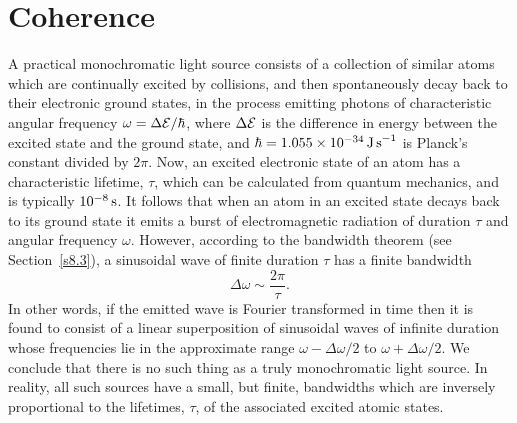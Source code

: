 \section{Coherence}
A practical monochromatic light source consists of a collection of similar atoms which are continually excited by collisions, and
then spontaneously decay back to their electronic ground states, in the process emitting  photons of characteristic angular
frequency $\omega=\Delta{\cal E}/\hbar$, where $\Delta{\cal E}$ is the difference in energy between the excited state
and the ground state, and $\hbar = 1.055\times 10^{-34}\,{\rm J\,s}^{-1}$ is Planck's constant divided by $2\pi$. 
Now, an excited electronic state of an atom has a characteristic lifetime, $\tau$, which can be 
calculated from quantum mechanics, and is typically $10^{-8}\,{\rm s}$. It follows that when an atom in
an excited state decays back to its ground state it emits a  burst of electromagnetic radiation of duration $\tau$ and angular frequency $\omega$. 
However, according to the bandwidth theorem (see Section~\ref{s8.3}), a sinusoidal wave of finite duration $\tau$ has a finite bandwidth
\begin{equation}
\Delta\omega\sim \frac{2\pi}{\tau}.
\end{equation}
In other words, if the emitted wave is Fourier transformed in time then it is found to consist of a linear superposition of sinusoidal
waves of infinite duration whose frequencies lie in the approximate range $\omega-\Delta\omega/2$ to $\omega+\Delta\omega/2$. 
We conclude that there is no such thing as a truly  monochromatic light source. In reality, all such sources have a small, but finite, bandwidths
which are inversely proportional to the lifetimes, $\tau$, of the associated excited atomic states. 

